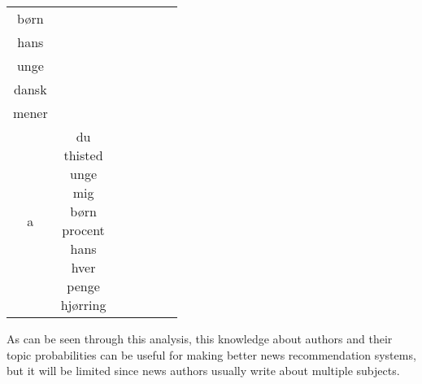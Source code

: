 \begin{table*}[h]
\begin{tabular}{c|c|c|c|c|c|c}
børn \\ hans \\ unge \\ dansk \\ mener \\ a} & \makecell{du \\ thisted \\ unge \\ mig \\ børn \\ procent \\ hans \\ hver \\ penge \\ hjørring} \\
		\bottomrule
	\end{tabular}
	\label{tab:author_top_words}
\end{table*}

As can be seen through this analysis, this knowledge about authors and their topic probabilities can be useful for making better news recommendation systems, but it will be limited since news authors usually write about multiple subjects.
